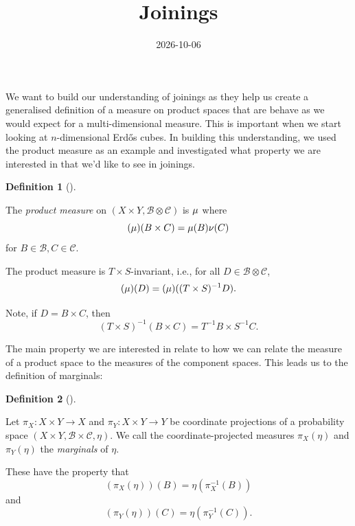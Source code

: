 \documentclass[
  british,
]{article}
\title{Joinings}
\author{}
\date{2026-10-06}
\theoremstyle{definition}
\newtheorem{definition}{Definition}[section]
\theoremstyle{plain}
\theoremstyle{remark}
\newcommand{\Measure}{{\mu}}
\newcommand{\ProjectionMap}[1][\vphantom{}]{{\pi}_{#1}}
\newcommand{\SigmaAlgebra}[1]{{\mathscr{#1}}}
\begin{document}
\maketitle


We want to build our understanding of joinings as they help us create a
generalised definition of a measure on product spaces that are behave as
we would expect for a multi-dimensional measure. This is important when
we start looking at \(n\)-dimensional Erdős cubes. In building this
understanding, we used the product measure as an example and
investigated what property we are interested in that we'd like to see in
joinings.

\begin{definition}[]\protect\hypertarget{def-ProductMeasure}{}\label{def-ProductMeasure}

The \emph{product measure} on
\((X\times Y,\SigmaAlgebra{B}\otimes\SigmaAlgebra{C})\) is
\(\ProductMeasure\) where
\[(\ProductMeasure)(B\times C)=\Measure(B)\nu(C)\] for
\(B\in\SigmaAlgebra{B},C\in\SigmaAlgebra{C}\).

The product measure is \(T\times S\)-invariant, i.e., for all
\(D\in\SigmaAlgebra{B}\otimes\SigmaAlgebra{C}\),
\[(\ProductMeasure)(D)=(\ProductMeasure)((T\times S)^{-1}D).\]

Note, if \(D=B\times C\), then
\[(T\times S)^{-1}(B\times C)=T^{-1}B\times S^{-1}C.\]

\end{definition}

The main property we are interested in relate to how we can relate the
measure of a product space to the measures of the component spaces. This
leads us to the definition of marginals:

\begin{definition}[]\protect\hypertarget{def-Marginals}{}\label{def-Marginals}

Let \(\ProjectionMap[X]:X\times Y\rightarrow X\) and
\(\ProjectionMap[Y]:X\times Y\rightarrow Y\) be coordinate projections
of a probability space
\((X\times Y,\SigmaAlgebra{B}\times\SigmaAlgebra{C},\eta)\). We call the
coordinate-projected measures \(\ProjectionMap[X](\eta)\) and
\(\ProjectionMap[Y](\eta)\) the \emph{marginals} of \(\eta\).

These have the property that
\[(\ProjectionMap[X](\eta))(B)=\eta(\ProjectionMap[X]^{-1}(B))\] and
\[(\ProjectionMap[Y](\eta))(C)=\eta(\ProjectionMap[Y]^{-1}(C)).\]

\end{definition}
\end{document}
